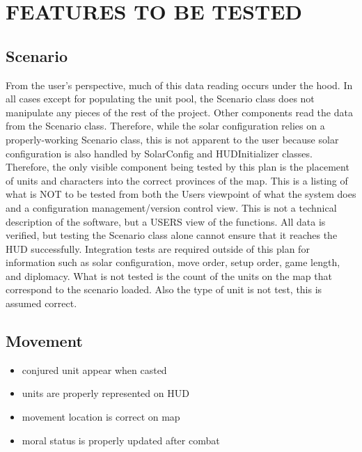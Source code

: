 \section[FEATURES TO BE TESTED]{\bfseries\color{black} FEATURES TO BE TESTED}
{\color{black}
\subsection{Scenario}
From the user's perspective, much of this data reading occurs under the hood. 
In all cases except for populating the unit pool, the Scenario class does not 
manipulate any pieces of the rest of the project. Other components read the 
data from the Scenario class. Therefore, while the solar configuration relies 
on a properly-working Scenario class, this is not apparent to the user because 
solar configuration is also handled by SolarConfig and HUDInitializer classes.
\newline
\newline
Therefore, the only visible component being tested by this plan is the placement 
of units and characters into the correct provinces of the map.
\newline
\newline
This is a listing of what is NOT to be tested from both the Users
viewpoint of what the system does and a configuration
management/version control view. This is not a technical description
of the software, but a USERS view of the functions.
\newline
\newline
All data is verified, but testing the Scenario class alone cannot ensure 
that it reaches the HUD successfully. Integration tests are required outside 
of this plan for information such as solar configuration, move order, setup order, 
game length, and diplomacy.
\newline
\newline
What is not tested is the count of the units on the map that correspond to the scenario loaded. Also the type of unit is not test, this is assumed correct. 



\subsection{Movement}

\begin{itemize}
\item conjured unit appear when casted
\item units are properly represented on HUD
\item movement location is correct on map
\item moral status is properly updated after combat
\end{itemize}

}
